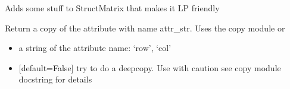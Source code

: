 \documentclass[letterpaper,10pt,english]{sphinxmanual}
\begin{document}
\begin{fulllineitems}
\label{\detokenize{modules_doc:cbmpy.CBCommon.StructMatrixLP}}
\pysigstartsignatures
{}
\pysigstopsignatures
\sphinxAtStartPar
Adds some stuff to StructMatrix that makes it LP friendly

\begin{fulllineitems}
\label{\detokenize{modules_doc:cbmpy.CBCommon.StructMatrixLP.getCopy}}
\pysigstartsignatures
{}
\pysigstopsignatures
\sphinxAtStartPar
Return a copy of the attribute with name attr\_str. Uses the copy module  or 
\begin{itemize}
\item {} 
\sphinxAtStartPar
{} a string of the attribute name: ‘row’, ‘col’

\item {} 
\sphinxAtStartPar
{} {[}default=False{]} try to do a deepcopy. Use with caution see copy module docstring for details

\end{itemize}

\end{fulllineitems}


\end{fulllineitems}

\end{document}
